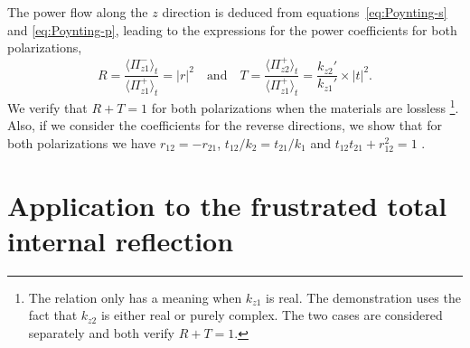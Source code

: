The power flow along the $z$ direction is deduced from equations~\ref{eq:Poynting-s} and \ref{eq:Poynting-p}, leading to the expressions for the power coefficients for both polarizations,
$$
R = \frac{\langle \Pi_{z1}^- \rangle_t}{\langle \Pi_{z1}^+ \rangle_t}
= |r|^2
\quad\textrm{and}\quad
T = \frac{\langle \Pi_{z2}^+ \rangle_t}{\langle \Pi_{z1}^+ \rangle_t} 
= \frac{k_{z2}'}{k_{z1}'} \times |t|^2.
$$
We verify that $R+T=1$ for both polarizations when the materials are lossless%
\footnote{The relation only has a meaning when $k_{z1}$ is real. The demonstration uses the fact that $k_{z2}$ is either real or purely complex. The two cases are considered separately and both verify $R+T=1$.}.
%
Also, if we consider the coefficients for the reverse directions, we show that for both polarizations we have
$r_{12} = - r_{21}$,
$t_{12}/k_2 = t_{21}/k_1$
and
$t_{12} t_{21} + r_{12}^2 = 1$
.


\section{Application to the frustrated total internal reflection}

